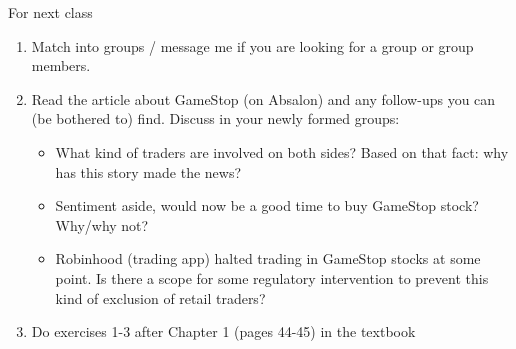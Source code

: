 \documentclass[english,10pt
,aspectratio=169
]{beamer}
\begin{document}
\begin{frame}{For next class}
\begin{enumerate}
	\item Match into groups / message me if you are looking for a group or group members.
	\item Read the article about GameStop (on Absalon) and any follow-ups you can (be bothered to) find. Discuss in your newly formed groups:
	\begin{itemize}
		\item What kind of traders are involved on both sides? Based on that fact: why has this story made the news?
		\item Sentiment aside, would now be a good time to buy GameStop stock? Why/why not?
		\item Robinhood (trading app) halted trading in GameStop stocks at some point. Is there a scope for some regulatory intervention to prevent this kind of exclusion of retail traders?
	\end{itemize} 
	\item Do exercises 1-3 after Chapter 1 (pages 44-45) in the textbook
\end{enumerate}
\end{frame}
\end{document}
